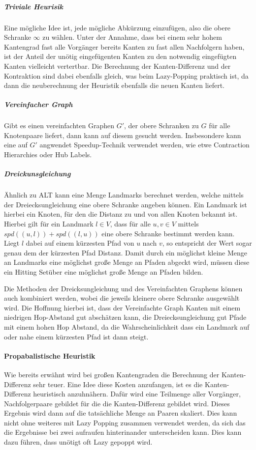 \subparagraph{Triviale Heurisik}
Eine mögliche Idee ist, jede mögliche Abkürzung einzufügen, also die obere Schranke $\infty$ zu wählen.
Unter der Annahme, dass bei einem sehr hohem Kantengrad fast alle Vorgänger bereits Kanten zu fast allen Nachfolgern haben, ist der Anteil der unötig eingefügenten Kanten zu den notwendig eingefügten Kanten vielleicht vertertbar.
Die Berechnung der Kanten-Differenz und der Kontraktion sind dabei ebenfalls gleich, was beim Lazy-Popping praktisch ist, da dann die neuberechnung der Heuristik ebenfalls die neuen Kanten liefert.

\subparagraph{Vereinfacher Graph}
Gibt es einen vereinfachten Graphen $G'$, der obere Schranken zu $G$ für alle Knotenpaare liefert, dann kann auf diesem gesucht werden.
Insbesondere kann eine auf $G'$ angwendet Speedup-Technik verwendet werden, wie etwe Contraction Hierarchies oder Hub Labels.

\subparagraph{Dreickunsgleichung}
Ähnlich zu ALT\cite{goldberg2005computing} kann eine Menge Landmarks berechnet werden, welche mittels der Dreiecksungleichung eine obere Schranke angeben können.
Ein Landmark ist hierbei ein Knoten, für den die Distanz zu und von allen Knoten bekannt ist.
Hierbei gilt für ein Landmark $l \in V$, dass für alle $u, v \in V$ mittels ${spd}((u, l)) + {spd}((l, u))$ eine obere Schranke bestimmt werden kann.
Liegt $l$ dabei auf einem kürzesten Pfad von $u$ nach $v$, so entspricht der Wert sogar genau dem der kürzesten Pfad Distanz.
Damit durch ein möglichst kleine Menge an Landmarks eine möglichst große Menge an Pfaden abgeckt wird, müssen diese ein Hitting Setüber eine möglichst große Menge an Pfaden bilden.

Die Methoden der Dreicksungleichung und des Vereinfachten Graphens können auch kombiniert werden, wobei die jeweils kleinere obere Schranke ausgewählt wird.
Die Hoffnung hierbei ist, dass der Vereinfachte Graph Kanten mit einem niedrigen Hop-Abstand gut abschätzen kann, die Dreiecksungleichung gut Pfade mit einem hohen Hop Abstand, da die Wahrscheinlichkeit dass ein Landmark auf oder nahe einem kürzesten Pfad ist dann steigt.

\paragraph{Propabalistische Heuristik}
Wie bereits erwähnt wird bei großen Kantengraden die Berechnung der Kanten-Differenz sehr teuer.
Eine Idee diese Kosten anzufangen, ist es die Kanten-Differenz heuristisch anzuhnähern.
Dafür wird eine Teilmenge aller Vorgänger, Nachfolgerpaare gebildet für die die Kanten-Differenz gebildet wird.
Dieses Ergebnis wird dann auf die tatsächliche Menge an Paaren skaliert.
Dies kann nicht ohne weiteres mit Lazy Popping zusammen verwendet werden, da sich das die Ergebnisse bei zwei aufraufen hinterinander unterscheiden kann.
Dies kann dazu führen, dass unötigt oft Lazy gepoppt wird.

